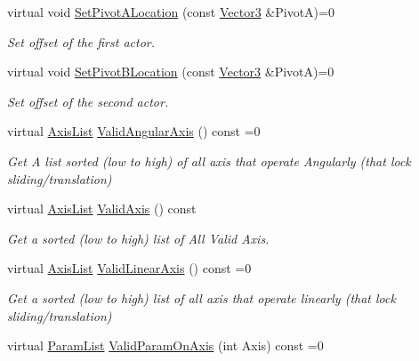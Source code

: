 \begin{DoxyCompactItemize}
virtual void \hyperlink{classphys_1_1TypedConstraint_aaa301fee77aa6e20ab202f604f0e9518}{SetPivotALocation} (const \hyperlink{classphys_1_1Vector3}{Vector3} \&PivotA)=0
\begin{DoxyCompactList}\small\item\em Set offset of the first actor. \item\end{DoxyCompactList}\item 
virtual void \hyperlink{classphys_1_1TypedConstraint_a518b3a40e517e21da8049e645a69fc96}{SetPivotBLocation} (const \hyperlink{classphys_1_1Vector3}{Vector3} \&PivotA)=0
\begin{DoxyCompactList}\small\item\em Set offset of the second actor. \item\end{DoxyCompactList}\item 
virtual \hyperlink{classphys_1_1TypedConstraint_a26261a4055e84e104c58d84eea5667c2}{AxisList} \hyperlink{classphys_1_1TypedConstraint_afd67483ff73a4b8ffef17c149b8a6cfa}{ValidAngularAxis} () const =0
\begin{DoxyCompactList}\small\item\em Get A list sorted (low to high) of all axis that operate Angularly (that lock sliding/translation) \item\end{DoxyCompactList}\item 
virtual \hyperlink{classphys_1_1TypedConstraint_a26261a4055e84e104c58d84eea5667c2}{AxisList} \hyperlink{classphys_1_1TypedConstraint_a6db21f6c516be6c98d9fa21963f30445}{ValidAxis} () const 
\begin{DoxyCompactList}\small\item\em Get a sorted (low to high) list of All Valid Axis. \item\end{DoxyCompactList}\item 
virtual \hyperlink{classphys_1_1TypedConstraint_a26261a4055e84e104c58d84eea5667c2}{AxisList} \hyperlink{classphys_1_1TypedConstraint_af9d5a6630d5f384825388a1e73c88b3a}{ValidLinearAxis} () const =0
\begin{DoxyCompactList}\small\item\em Get a sorted (low to high) list of all axis that operate linearly (that lock sliding/translation) \item\end{DoxyCompactList}\item 
virtual \hyperlink{classphys_1_1TypedConstraint_a4c2dcea3fbb764e454840329126d034e}{ParamList} \hyperlink{classphys_1_1TypedConstraint_af9f4c03dbba0d55e60dce341dbdc1105}{ValidParamOnAxis} (int Axis) const =0

\end{DoxyCompactItemize}
